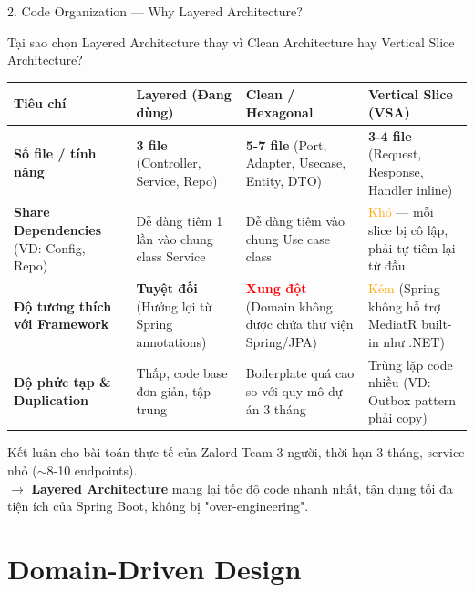 \documentclass[aspectratio=169,compress]{beamer}
\begin{document}
\begin{frame}{2. Code Organization --- Why Layered Architecture?}
\begin{block}{Tại sao chọn Layered Architecture thay vì Clean Architecture hay Vertical Slice Architecture?}
\scriptsize
\begin{tabular}{|p{}|p{}|p{}|p{}|}
\hline
\textbf{Tiêu chí} & \textbf{Layered (Đang dùng)} & \textbf{Clean / Hexagonal} & \textbf{Vertical Slice (VSA)} \\
\hline
\textbf{Số file / tính năng} & \textbf{3 file} (Controller, Service, Repo) & \textbf{5-7 file} (Port, Adapter, Usecase, Entity, DTO) & \textbf{3-4 file} (Request, Response, Handler inline) \\
\hline
\textbf{Share Dependencies} (VD: Config, Repo) & Dễ dàng tiêm 1 lần vào chung class Service & Dễ dàng tiêm vào chung Use case class & \textcolor{orange}{Khó} --- mỗi slice bị cô lập, phải tự tiêm lại từ đầu \\
\hline
\textbf{Độ tương thích với Framework} & \textcolor{green!60!black}{\textbf{Tuyệt đối}} (Hưởng lợi từ Spring annotations) & \textcolor{red}{\textbf{Xung đột}} (Domain không được chứa thư viện Spring/JPA) & \textcolor{orange}{Kém} (Spring không hỗ trợ MediatR built-in như .NET) \\
\hline
\textbf{Độ phức tạp \& Duplication} & Thấp, code base đơn giản, tập trung & Boilerplate quá cao so với quy mô dự án 3 tháng & Trùng lặp code nhiều (VD: Outbox pattern phải copy) \\
\hline
\end{tabular}
\end{block}

\begin{alertblock}{Kết luận cho bài toán thực tế của Zalord}
Team 3 người, thời hạn 3 tháng, service nhỏ ($\sim$8-10 endpoints).\\
$\rightarrow$ \textbf{Layered Architecture} mang lại tốc độ code nhanh nhất, tận dụng tối đa tiện ích của Spring Boot, không bị "over-engineering".
\end{alertblock}
\end{frame}

\section{Domain-Driven Design}
\end{document}
